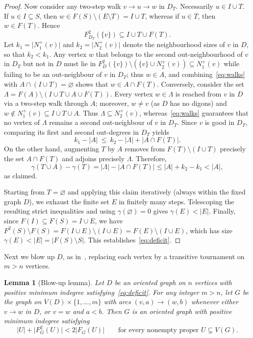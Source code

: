 \documentclass[11pt]{amsart}
\newtheorem{lemma}[theorem]{Lemma}
\theoremstyle{remark}
\newcommand{\abs}[1]{\lvert #1\rvert}
\begin{document}
\begin{proof}
Now consider any two-step walk $v\to u\to w$ in $D_T$. Necessarily $u\in I\cup T$. If $u\in I\subseteq S$, then $w\in F(S)\setminus(E\setminus T)=I\cup T$, whereas if $u\in T$, then $w\in F(T)$. Hence
\begin{equation}\label{eq:walks}
  F^2_{D_T}(\{v\})\subseteq I\cup T\cup F(T).
\end{equation}
Let $k_1=\abs{N_1^+(v)}$ and $k_2=\abs{N_2^+(v)}$ denote the neighbourhood sizes of $v$ in $D$, so that $k_2<k_1$. Any vertex $w$ that belongs to the second out-neighbourhood of $v$ in $D_T$ but not in $D$ must lie in $F_D^2(\{v\})\setminus(\{v\}\cup N_2^+(v))\subseteq N_1^+(v)$ while failing to be an out-neighbour of $v$ in $D_T$; thus $w\in A$, and combining~\eqref{eq:walks} with $A\cap(I\cup T)=\varnothing$ shows that $w\in A\cap F(T)$. Conversely, consider the set $\Lambda=F(A)\setminus(I\cup T\cup A\cup F(T))$. Every vertex $w\in\Lambda$ is reached from $v$ in $D$ via a two-step walk through $A$; moreover, $w\neq v$ (as $D$ has no digons) and $w\notin N_1^+(v)\subseteq I\cup T\cup A$. Thus $\Lambda\subseteq N_2^+(v)$, whereas~\eqref{eq:walks} guarantees that no vertex of $\Lambda$ remains a second out-neighbour of $v$ in $D_T$. Since $v$ is good in $D_T$, comparing its first and second out-degrees in $D_T$ yields
\[
  k_1-\abs A\ \le\ k_2-\abs{\Lambda}+\abs{A\cap F(T)}.
\]
On the other hand, augmenting $T$ by $A$ removes from $F(T)\setminus(I\cup T)$ precisely the set $A\cap F(T)$ and adjoins precisely $\Lambda$. Therefore,
\[
  \gamma(T\cup A)-\gamma(T)=\abs{\Lambda}-\abs{A\cap F(T)}\le\abs A+k_2-k_1<\abs A,
\]
as claimed.

Starting from $T=\varnothing$ and applying this claim iteratively (always within the fixed graph $D$), we exhaust the finite set $E$ in finitely many steps. Telescoping the resulting strict inequalities and using $\gamma(\varnothing)=0$ gives $\gamma(E)<\abs E$. Finally, since $F(I)\subseteq F(S)=I\cup E$, we have $F^2(S)\setminus F(S)=F(I\cup E)\setminus(I\cup E)=F(E)\setminus(I\cup E)$, which has size $\gamma(E)<\abs E=\abs{F(S)\setminus S}$. This establishes~\eqref{eq:deficit}.
\end{proof}

Next we blow up $D$, as in~\cite[Theorem~4.3]{BBKS}, replacing each vertex by a transitive tournament on $m>n$ vertices.

\begin{lemma}[Blow-up lemma]\label{lem:blowup}
Let $D$ be an oriented graph on $n$ vertices with positive minimum indegree satisfying~\eqref{eq:deficit}. For any integer $m>n$, let $G$ be the graph on $V(D)\times\{1,\dots,m\}$ with arcs $(v,a)\to(w,b)$ whenever either $v\to w$ in $D$, or $v=w$ and $a<b$. Then $G$ is an oriented graph with positive minimum indegree satisfying
\begin{equation}\label{eq:concave}
  \abs U+\abs{F_G^2(U)}<2\abs{F_G(U)}
  \qquad\text{for every nonempty proper }U\subsetneq V(G).
\end{equation}
\end{lemma}
\end{document}
